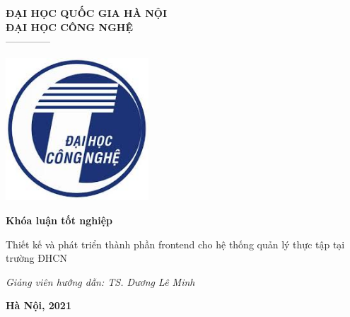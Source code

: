 \documentclass[./main.tex]{subfiles}
\begin{document}
\begin{titlepage}	
	\begin{center}
		\textbf{ĐẠI HỌC QUỐC GIA HÀ NỘI}\\
		\textbf{ĐẠI HỌC CÔNG NGHỆ}\\
		--------------
	
		\vspace*{30pt}
		
		\includegraphics[width=0.4\textwidth]{./images/uet.jpg}
		
		\vspace*{50pt}
		
		\textbf{Khóa luận tốt nghiệp}
		
		{\huge Thiết kế và phát triển thành phần frontend cho hệ thống quản lý thực tập tại trường ĐHCN}
		\vspace*{30pt}

		\textit{Giảng viên hướng dẫn: TS. Dương Lê Minh}
		
		\vfill
	\end{center}
	
	
	\begin{center}
		\textbf{Hà Nội, 2021}
	\end{center}
\end{titlepage}
\end{document}
